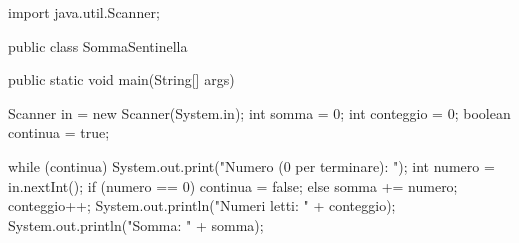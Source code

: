 \begin{unipdcode}[language=Java]
import java.util.Scanner;

public class SommaSentinella {
    public static void main(String[] args) {
        Scanner in = new Scanner(System.in);
        int somma = 0;
        int conteggio = 0;
        boolean continua = true;

        while (continua) {
            System.out.print("Numero (0 per terminare): ");
            int numero = in.nextInt();
            if (numero == 0) {
                continua = false;
            } else {
                somma += numero;
                conteggio++;
            }
        }
        System.out.println("Numeri letti: " + conteggio);
        System.out.println("Somma: " + somma);
    }
}
\end{unipdcode}
